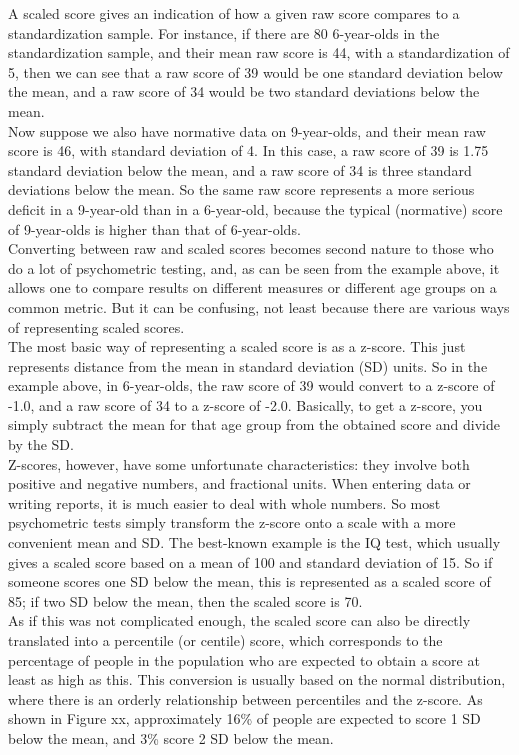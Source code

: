 \documentclass{krantz}
\begin{document}
\begin{tcolorbox}[enhanced, breakable,colback=Black!5!lightgray,colframe=black!75!black,coltitle=white,title=How scaled scores are derived]
A scaled score gives an indication of how a given raw score compares to a standardization sample. For instance, if there are 80 6-year-olds in the standardization sample, and their mean raw score is 44, with a standardization of 5, then we can see that a raw score of 39 would be one standard deviation below the mean, and a raw score of 34 would be two standard deviations below the mean.\\
Now suppose we also have normative data on 9-year-olds, and their mean raw score is 46, with standard deviation of 4. In this case, a raw score of 39 is 1.75 standard deviation below the mean, and a raw score of 34 is three standard deviations below the mean. So the same raw score represents a more serious deficit in a 9-year-old than in a 6-year-old, because the typical (normative) score of 9-year-olds is higher than that of 6-year-olds.\\
Converting between raw and scaled scores becomes second nature to those who do a lot of psychometric testing, and, as can be seen from the example above, it allows one to compare results on different measures or different age groups on a common metric. But it can be confusing, not least because there are various ways of representing scaled scores.\\
The most basic way of representing a scaled score is as a z-score. This just represents distance from the mean in standard deviation (SD) units. So in the example above, in 6-year-olds, the raw score of 39 would convert to a z-score of -1.0, and a raw score of 34 to a z-score of -2.0. Basically, to get a z-score, you simply subtract the mean for that age group from the obtained score and divide by the SD.\\
Z-scores, however, have some unfortunate characteristics: they involve both positive and negative numbers, and fractional units. When entering data or writing reports, it is much easier to deal with whole numbers. So most psychometric tests simply transform the z-score onto a scale with a more convenient mean and SD. The best-known example is the IQ test, which usually gives a scaled score based on a mean of 100 and standard deviation of 15. So if someone scores one SD below the mean, this is represented as a scaled score of 85; if two SD below the mean, then the scaled score is 70.\\
As if this was not complicated enough, the scaled score can also be directly translated into a percentile (or centile) score, which corresponds to the percentage of people in the population who are expected to obtain a score at least as high as this. This conversion is usually based on the normal distribution, where there is an orderly relationship between percentiles and the z-score. As shown in Figure xx, approximately 16\% of people are expected to score 1 SD below the mean, and 3\% score 2 SD below the mean.



\end{tcolorbox}
\end{document}

